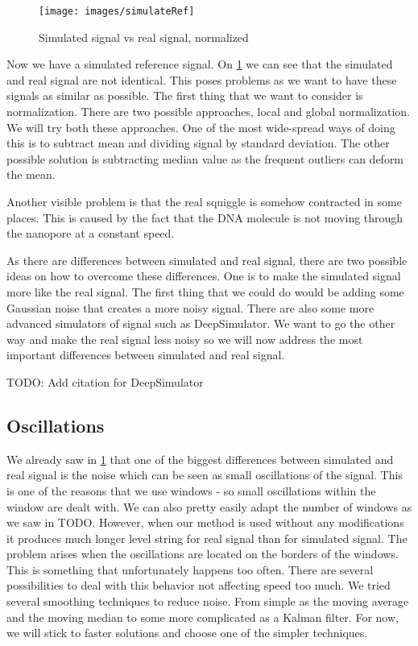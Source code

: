 \begin{figure}
\centerline{\texttt{[image: images/simulateRef]}}
\caption[Hehe]{Simulated signal vs real signal, normalized}
\label{obr:simVsReal}
\end{figure}

Now we have a simulated reference signal. On \ref{obr:simVsReal} we can see that the simulated and real
signal are not identical. This poses problems as we want to have these signals as
similar as possible. The first thing that we want to consider is normalization. There
are two possible approaches, local and global normalization. We will try both these
approaches. One of the most wide-spread ways of doing this is to subtract mean and dividing
signal by standard deviation. The other possible solution is subtracting median value
as the frequent outliers can deform the mean.

Another visible problem is that the real squiggle is somehow contracted
in some places. This is caused by the fact that the DNA molecule is not moving
through the nanopore at a constant speed.

As there are differences between simulated and real signal, there are two possible
ideas on how to overcome these differences. One is to make the simulated signal more like
the real signal. The first thing that we could do would be adding some Gaussian noise
that creates a more noisy signal. There are also some more advanced simulators of
signal such as DeepSimulator. We want to go the other way and make the real signal
less noisy so we will now address the most important differences between simulated and real signal.


TODO: Add citation for DeepSimulator

\subsection{Oscillations}

We already saw in \ref{obr:simVsReal} that one of the biggest differences between simulated and
real signal is the noise which can be seen as small oscillations of the signal. This is
one of the reasons that we use windows - so small oscillations within the window
are dealt with. We can also pretty easily adapt the number of windows as we saw in TODO.
However, when our method is used without any modifications it
produces much longer level string for real signal than for simulated signal.
The problem arises when the oscillations are located on the borders of the windows.
This is something that unfortunately happens too often.
There are several possibilities to deal with this behavior not affecting speed too
much. We tried several smoothing techniques to reduce noise. From simple as the
moving average and the moving median to some more complicated as a Kalman filter.
For now, we will stick to faster solutions and choose one of the simpler techniques.

